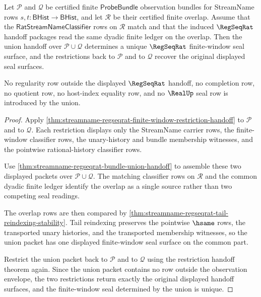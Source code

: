 \begin{theorem}
\label{thm:streamname-regseqrat-finite-window-union-seal-determinacy}
Let $\mathcal P$ and $\mathcal Q$ be certified finite $\mathsf{ProbeBundle}$
observation bundles for StreamName rows $s,t:\mathsf{BHist}\to\mathsf{BHist}$,
and let $\mathcal R$ be their certified finite overlap. Assume that the
$\mathsf{RatStreamNameClassifier}$ rows on $\mathcal R$ match and that the
induced $\RegSeqRat$ handoff packages read the same dyadic finite ledger on
the overlap. Then the union handoff over $\mathcal P\cup\mathcal Q$ determines
a unique $\RegSeqRat$ finite-window seal surface, and the restrictions back to
$\mathcal P$ and to $\mathcal Q$ recover the original displayed seal surfaces.

No regularity row outside the displayed $\RegSeqRat$ handoff, no completion
row, no quotient row, no host-index equality row, and no $\RealUp$ seal row is
introduced by the union.
\end{theorem}
\begin{proof}
Apply
\autoref{thm:streamname-regseqrat-finite-window-restriction-handoff} to
$\mathcal P$ and to $\mathcal Q$. Each restriction displays only the StreamName
carrier rows, the finite-window classifier rows, the unary-history and bundle
membership witnesses, and the pointwise rational-history classifier rows.

Use \autoref{thm:streamname-regseqrat-bundle-union-handoff} to assemble these
two displayed packets over $\mathcal P\cup\mathcal Q$. The matching classifier
rows on $\mathcal R$ and the common dyadic finite ledger identify the overlap
as a single source rather than two competing seal readings.

The overlap rows are then compared by
\autoref{thm:streamname-regseqrat-tail-reindexing-stability}. Tail reindexing
preserves the pointwise $\hsame$ rows, the transported unary histories, and
the transported membership witnesses, so the union packet has one displayed
finite-window seal surface on the common part.

Restrict the union packet back to $\mathcal P$ and to $\mathcal Q$ using the
restriction handoff theorem again. Since the union packet contains no row
outside the observation envelope, the two restrictions return exactly the
original displayed handoff surfaces, and the finite-window seal determined by
the union is unique.
\end{proof}

